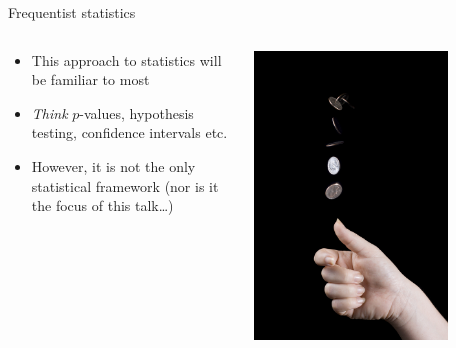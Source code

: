 \documentclass[aspectratio=169]{beamer}
\begin{document}
\begin{frame}{Frequentist statistics}
  \begin{columns}
    \begin{column}{0.6\textwidth}
      \begin{itemize}
        \item This approach to statistics will be familiar to most
        \item \emph{Think} $p$-values, hypothesis testing, confidence intervals etc.
        \item However, it is not the only statistical framework (nor is it the
               focus of this talk\ldots)
      \end{itemize}
    \end{column}%
    \begin{column}{0.4\textwidth}
      \centering
      \vspace{-0.75cm}
      \includegraphics[width=0.75\textwidth]{tosser.jpg}
    \end{column}
  \end{columns}
\end{frame}
\end{document}
